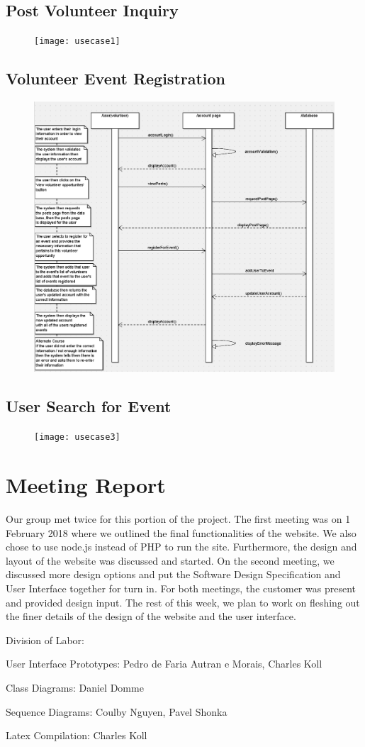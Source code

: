 \documentclass[12pt]{article}
\begin{document}
\subsection{Post Volunteer Inquiry}
\begin{figure}[h!]
\texttt{[image: usecase1]}
\end{figure}
\pagebreak
\subsection{Volunteer Event Registration}
\begin{figure}[h!]
\includegraphics[width=\textwidth]{usecase2}
\end{figure}
\pagebreak
\subsection{User Search for Event}
\begin{figure}[h!]
\texttt{[image: usecase3]}
\end{figure}
\pagebreak
\section{Meeting Report}
Our group met twice for this portion of the project. The first meeting was on 1 February
2018 where we outlined the final functionalities of the website. We also chose to use
node.js instead of PHP to run the site. Furthermore, the design and layout of the
website was discussed and started. On the second meeting, we discussed more design options
and put the Software Design Specification and User Interface together for turn in. For
both meetings, the customer was present and provided design input. The rest of this week,
we plan to work on fleshing out the finer details of the design of the website and the
user interface.

\quad

Division of Labor:

User Interface Prototypes: Pedro de Faria Autran e Morais, Charles Koll

Class Diagrams: Daniel Domme

Sequence Diagrams: Coulby Nguyen, Pavel Shonka

Latex Compilation: Charles Koll
\end{document}
